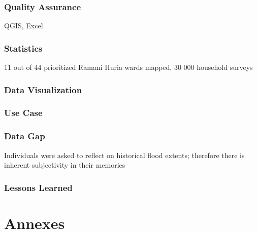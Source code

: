 \documentclass[a4paper,12pt,twoside]{article}
\begin{document}
\subsubsection{Quality Assurance}
QGIS, Excel

\subsubsection{Statistics}
11 out of 44 prioritized Ramani Huria wards mapped, 30 000 household surveys

\subsubsection{Data Visualization}

\subsubsection{Use Case}

\subsubsection{Data Gap}
Individuals were asked to reflect on historical flood extents; therefore there is inherent subjectivity in their memories

\subsubsection{Lessons Learned}

\newpage
\section{Annexes}
\end{document}
